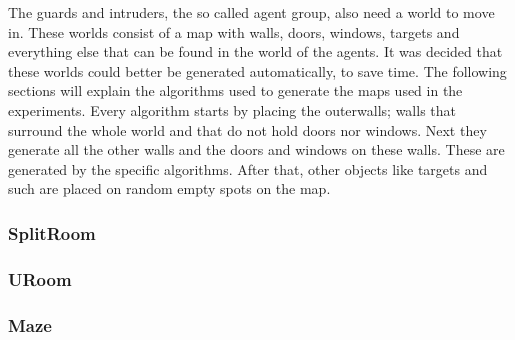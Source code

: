
The guards and intruders, the so called agent group, also need a world to move in. These worlds consist of a map with walls, doors, windows, targets and everything else that can be found in the world of the agents. It was decided that these worlds could better be generated automatically, to save time. The following sections will explain the algorithms used to generate the maps used in the experiments.
Every algorithm starts by placing the outerwalls; walls that surround the whole world and that do not hold doors nor windows. Next they generate all the other walls and the doors and windows on these walls. These are generated by the specific algorithms. After that, other objects like targets and such are placed on random empty spots on the map.

\subsubsection{SplitRoom}

\subsubsection{URoom}
\subsubsection{Maze}